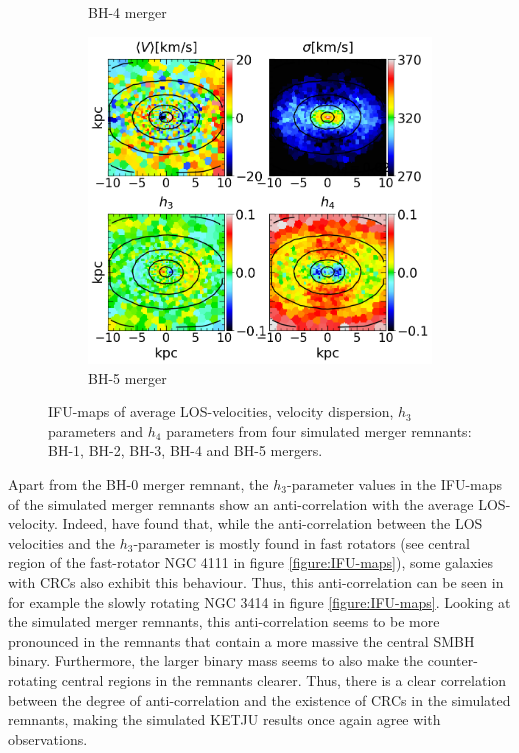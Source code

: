 \documentclass[english, twoside]{HYgradu}
\begin{document}
\begin{figure}
\begin{subfigure}[b]{0.49\textwidth}
		\caption{BH-4 merger}
	\end{subfigure}
	\begin{subfigure}[b]{0.49\textwidth}
		\includegraphics[width=\textwidth]{BH_5.png}
		\caption{BH-5 merger}
	\end{subfigure}
	\caption{IFU-maps of average LOS-velocities, velocity dispersion, $h_3$ parameters and $h_4$ parameters from four simulated merger remnants: BH-1, BH-2, BH-3, BH-4 and BH-5 mergers.}
	\label{figure:rest_of_voronoi}
\end{figure}



Apart from the BH-0 merger remnant, the $h_3$-parameter values in the IFU-maps of the simulated merger remnants show an anti-correlation with the average LOS-velocity. Indeed, \cite{Krajnovic2011} have found that, while the anti-correlation between the LOS velocities and the $h_3$-parameter is mostly found in fast rotators (see central region of the fast-rotator NGC 4111 in figure \ref{figure:IFU-maps}), some galaxies with CRCs also exhibit this behaviour. Thus, this anti-correlation can be seen in for example the slowly rotating NGC 3414 in figure \ref{figure:IFU-maps}. Looking at the simulated merger remnants, this anti-correlation seems to be more pronounced in the remnants that contain a more massive the central SMBH binary. Furthermore, the larger binary mass seems to also make the counter-rotating central regions in the remnants clearer. Thus, there is a clear correlation between the degree of anti-correlation and the existence of CRCs in the simulated remnants, making the simulated KETJU results once again agree with observations.
\end{document}
